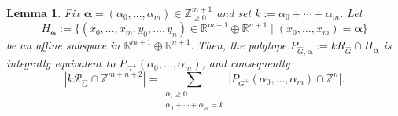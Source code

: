\documentclass[11pt,a4paper]{article}
\newcommand{\vct}[1]{\boldsymbol{#1}}
\newcommand{\R}{\mathbb{R}}
\newcommand{\Z}{\mathbb{Z}}
\newcommand{\1}{\mathbf{1}}
\theoremstyle{plain}
\newtheorem{lemma}[theorem]{Lemma}
\theoremstyle{definition}
\begin{document}
\begin{lemma}\label{lem:slicing-root-polytope}
Fix $\vct{\alpha}=(\alpha_0,\ldots,\alpha_m)\in\Z_{\ge0}^{m+1}$ and set $
k:=\alpha_0+\cdots+\alpha_m.$ Let 
\[H_{\vct{\alpha}} :=\{(x_0,\dots, x_m,y_0,\dots, y_n) \in \R^{m+1}\oplus \R^{n+1}\mid (x_0,\dots,x_m) = \vct{\alpha}\}\]
be an affine subspace in $\R^{m+1}\oplus \R^{n+1}.$
Then, the polytope $P_{\widehat G,\vct{\alpha}}:=kR_{\widehat G}\cap H_{\vct{\alpha}}$ is integrally equivalent to $P_{G^+}(\alpha_0,\dots, \alpha_m)$, and consequently
\begin{equation}
|k\mathcal R_{\widehat G}\cap\Z^{m+n+2}|
=\sum_{\substack{\alpha_i\ge0\\\alpha_0+\cdots+\alpha_m=k}}
|P_{G^+}(\alpha_0,\ldots,\alpha_m)\cap\Z^n|.
\label{eq:slicing}
\end{equation}
\end{lemma}
\end{document}
